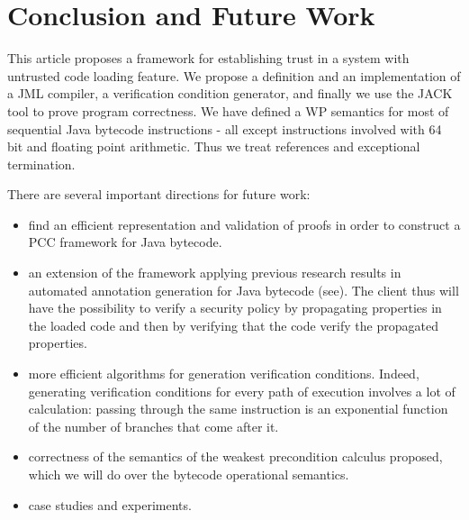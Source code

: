 \section{Conclusion and Future Work}\label{conclusion}
This article proposes a framework for establishing trust in a system with untrusted code loading feature. We propose a definition and an implementation of a JML compiler, a verification condition generator, and finally we use the JACK tool to prove program correctness. We have defined a WP semantics for most of sequential Java bytecode instructions - all except instructions involved with 64 bit and floating point arithmetic. Thus we treat references and exceptional termination.


There are several important directions for future work:
\begin{itemize}
\item find an efficient representation and validation of proofs in order to construct a PCC framework for Java bytecode. 
\item an extension of the framework applying previous research results in automated annotation generation for Java bytecode (see\cite{PBBHL}). The client thus will have the possibility to verify a security policy by propagating properties in the loaded code and then by verifying that the code verify the propagated properties.
\item more efficient algorithms for generation verification conditions. Indeed, generating verification conditions for every path of execution involves a lot of calculation: passing through the same instruction is an exponential function of the number of branches that come after it. 
\item correctness of the semantics of the weakest precondition calculus proposed, which we will do over the bytecode operational semantics. 
\item case studies and experiments.
\end{itemize}

